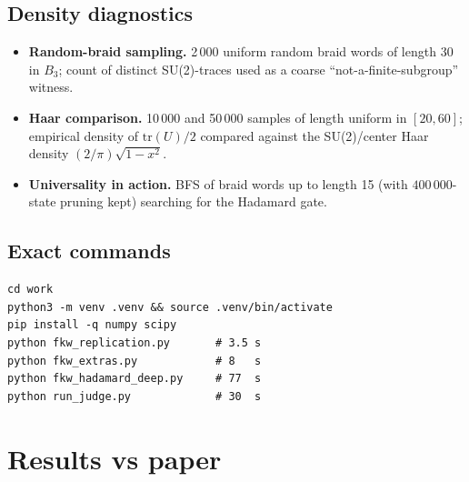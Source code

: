 \documentclass[11pt]{article}
\begin{document}
\subsection{Density diagnostics}
\begin{itemize}
  \item \textbf{Random-braid sampling.} 2\,000 uniform random braid words of length 30 in $B_3$; count of distinct SU(2)-traces used as a coarse ``not-a-finite-subgroup'' witness.
  \item \textbf{Haar comparison.} 10\,000 and 50\,000 samples of length uniform in $[20,60]$; empirical density of $\mathrm{tr}(U)/2$ compared against the SU(2)/center Haar density $(2/\pi)\sqrt{1 - x^2}$.
  \item \textbf{Universality in action.} BFS of braid words up to length 15 (with $400\,000$-state pruning kept) searching for the Hadamard gate.
\end{itemize}

\subsection{Exact commands}
\begin{verbatim}
cd work
python3 -m venv .venv && source .venv/bin/activate
pip install -q numpy scipy
python fkw_replication.py       # 3.5 s
python fkw_extras.py            # 8   s
python fkw_hadamard_deep.py     # 77  s
python run_judge.py             # 30  s
\end{verbatim}

\section{Results vs paper}
\end{document}
